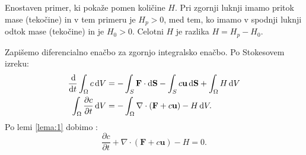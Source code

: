 \documentclass[mat2, tisk]{fmfdelo}
\newcommand{\bd}{\textbf}
\begin{document}
\begin{primer}
Enostaven primer, ki pokaže pomen količine $H$. Pri zgornji luknji imamo pritok 
mase (tekočine) in v tem primeru je $H_{p} > 0$, med tem, ko imamo v spodnji luknji odtok
mase (tekočine) in je $H_{0} > 0$. Celotni $H$ je razlika $H = H_p - H_0$.\\
\begin{center}
\end{center}
\end{primer}
Zapišemo diferencialno enačbo za zgornjo integralsko enačbo. Po Stokesovem izreku:
\begin{align*}
\frac{\dif}{\dif t} \int_{\Omega} c \dif V &= - \int_S \bd{F} \cdot \dif \bd{S} - 
\int_S c \bd{u}  \dif \bd{S} + \int_\Omega H \dif V \\
\int_{\Omega} \frac{\partial c}{\partial t} \dif V &= - \int_\Omega \nabla\cdot(\bd{F} + c \bd{u}) - H \dif V .
\end{align*}
Po lemi \ref{lema:1} dobimo :
\begin{equation}
\frac{\partial c}{\partial t} + \nabla \cdot (\bd{F} + c\bd{u}) - H = 0.
\end{equation}
\end{document}
